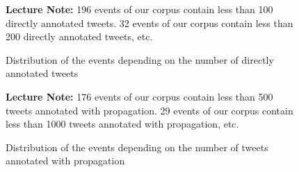 \begin{figure}
\begin{center}

\end{center}
{\scriptsize 

\textbf{Lecture Note:} 196 events of our corpus contain less than 100 directly annotated tweets. 32 events of our corpus contain less than 200 directly annotated tweets, etc.
}
\caption{Distribution of the events depending on the number of directly annotated tweets}
\label{Figure:HistogramEventsByNbTweets_Related}
\end{figure}

\begin{figure}
\begin{center}

\end{center}
{\scriptsize 

\textbf{Lecture Note:} 176 events of our corpus contain less than 500 tweets annotated with propagation. 29 events of our corpus contain less than 1000 tweets annotated with propagation, etc.
}
\caption{Distribution of the events depending on the number of tweets  annotated with propagation}
\label{Figure:HistogramMachineEventsByNbTweets_Related}
\end{figure}

